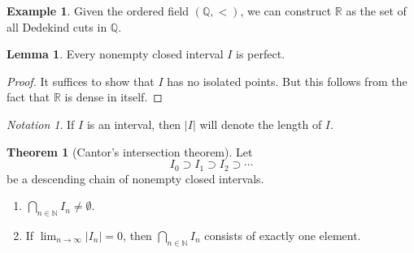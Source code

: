 \documentclass[10pt,letterpaper,cm]{nupset}
\theoremstyle{definition}
\newtheorem{exmp}[definition]{Example}
\theoremstyle{theorem}
\newtheorem{theorem}[definition]{Theorem}
\newtheorem{lemma}[definition]{Lemma}
\theoremstyle{remark}
\newtheorem*{notation}{Notation}
\newcommand{\N}{\mathbb N}
\newcommand{\Q}{\mathbb Q}
\newcommand{\R}{\mathbb R}
\newcommand{\1}{\mathbf{1}}
\newcommand{\0}{\vec 0}
\begin{document}
\begin{exmp}
Given the ordered field $(\Q, <)$, we can construct $\R$ as the set of all Dedekind cuts in $\Q$.
\end{exmp}

\begin{lemma}
Every nonempty closed interval $I$ is perfect.
\end{lemma}
\begin{proof}
It suffices to show that $I$ has no isolated points. But this follows from the fact that $\R$ is dense in itself. 
\end{proof}

\begin{notation}
If $I$ is an interval, then $\lvert{I}\rvert$ will denote the length of $I$.
\end{notation}

\begin{theorem}[Cantor's intersection theorem] Let $$I_0 \supset I_1 \supset I_2 \supset \cdots $$ be a descending chain of nonempty closed intervals.
\begin{enumerate}
\item $\bigcap_{n\in \N} I_n \ne \emptyset$.
\item If $\lim_{n\to \infty} \lvert{I_n}\rvert =0$, then $\bigcap_{n\in \N} I_n$ consists of exactly one element. 
\end{enumerate}
\end{theorem}
\end{document}
